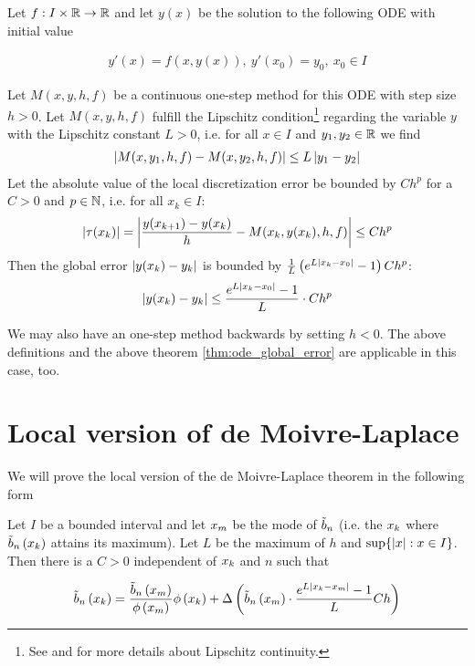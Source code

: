 \begin{theorem} \label{thm:ode_global_error}
  Let $f:I\times \mathbb R\to\mathbb R$ and let $y(x)$ be the solution to the following ODE with initial value

  \begin{align}
    y'(x)=f(x,y(x)),\ y'(x_0)=y_0,\ x_0 \in I
  \end{align}

  Let $M(x,y,h,f)$ be a continuous one-step method for this ODE with step size $h > 0$. Let $M(x,y,h,f)$ fulfill the Lipschitz condition\footnote{See \cite[p. 467]{stoer} and \cite{wiki:lipschitz} for more details about Lipschitz continuity.} regarding the variable $y$ with the Lipschitz constant $L > 0$, i.e. for all $x\in I$ and $y_1,y_2\in\mathbb R$ we find
  \begin{align}
    \left|{M(x,y_1,h,f)-M(x,y_2,h,f)}\right| \le L \left|{y_1-y_2}\right|
  \end{align}
  Let the absolute value of the local discretization error be bounded by $C h^p$ for a $C > 0$ and $p\in \mathbb N$, i.e. for all $x_k \in I$:
  \begin{align}
    \left|{\tau(x_k)}\right| = \left|{\frac{y(x_{k+1})-y(x_k)}h - M(x_k,y(x_k),h,f)}\right| \le Ch^p
  \end{align}
  Then the global error $\left|{y(x_k)-y_k}\right|$ is bounded by $\frac 1L \left( {e^{L\left|{x_k-x_0}\right|}-1} \right) C h^p$:
  \begin{align}
    \left|{y(x_k)-y_k}\right| \le \frac{e^{L\left|{x_k-x_0}\right|}-1}{L} \cdot Ch^p
  \end{align}
\end{theorem}

We may also have an one-step method backwards by setting $h < 0$. The above definitions and the  above theorem \ref{thm:ode_global_error} are applicable in this case, too.

\section{Local version of de Moivre-Laplace}

We will prove the local version of the de Moivre-Laplace theorem in the following form

\newcommand*{\bnp}{\bb{\xnp}}
\newcommand*{\knp}{m}
\newcommand*{\xnp}{\x[\knp]}
\newcommand*{\phin}[2][n]{y_{#1}\left({#2}\right)}
\newcommand*{\dphin}[2][n]{y_{#1}'\left({#2}\right)}

\begin{theorem}
  Let $I$ be a bounded interval and let $\xnp$ be the mode of $\tilde b_{n}$ (i.e. the $x_{k}$ where $\tilde b_{n}\left({x_{k}}\right)$ attains its maximum). Let $L$ be the maximum of $h$ and $\sup\{\left|{x}\right|: x \in I\}$. Then there is a $C > 0$ independent of $x_{k}$ and $n$ such that

  \begin{align}
    \bb{\x} = \frac{\bnp}{\fphi{\xnp}}\fphi{\x} + \bigabs{{\bnp}\cdot \frac{\fe{L\abs{\x-\xnp}}-1}L Ch}
  \end{align}
\end{theorem}

